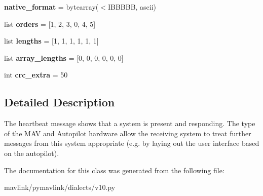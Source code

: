 \begin{DoxyCompactItemize}
\item 
\mbox{\label{classpymavlink_1_1dialects_1_1v10_1_1MAVLink__heartbeat__message_aaccc98a2c72d1adffbe2a30bb743f0c9}} 
{\bfseries native\+\_\+format} = bytearray(\textquotesingle{}$<$I\+B\+B\+B\+BB\textquotesingle{}, \textquotesingle{}ascii\textquotesingle{})
\item 
\mbox{\label{classpymavlink_1_1dialects_1_1v10_1_1MAVLink__heartbeat__message_affb0f7c9daf16dbc47ec880c6af96b25}} 
list {\bfseries orders} = \mbox{[}1, 2, 3, 0, 4, 5\mbox{]}
\item 
\mbox{\label{classpymavlink_1_1dialects_1_1v10_1_1MAVLink__heartbeat__message_a5175881629fe581338601347a2bb705c}} 
list {\bfseries lengths} = \mbox{[}1, 1, 1, 1, 1, 1\mbox{]}
\item 
\mbox{\label{classpymavlink_1_1dialects_1_1v10_1_1MAVLink__heartbeat__message_adf3ebc94bebcc128d64203ba09ea7351}} 
list {\bfseries array\+\_\+lengths} = \mbox{[}0, 0, 0, 0, 0, 0\mbox{]}
\item 
\mbox{\label{classpymavlink_1_1dialects_1_1v10_1_1MAVLink__heartbeat__message_aa9730e9f1d4376514b9588616f37d154}} 
int {\bfseries crc\+\_\+extra} = 50
\end{DoxyCompactItemize}


\subsection{Detailed Description}
\begin{DoxyVerb}The heartbeat message shows that a system is present and
responding. The type of the MAV and Autopilot hardware allow
the receiving system to treat further messages from this
system appropriate (e.g. by laying out the user interface
based on the autopilot).
\end{DoxyVerb}
 

The documentation for this class was generated from the following file\+:\begin{DoxyCompactItemize}
\item 
mavlink/pymavlink/dialects/v10.\+py\end{DoxyCompactItemize}
